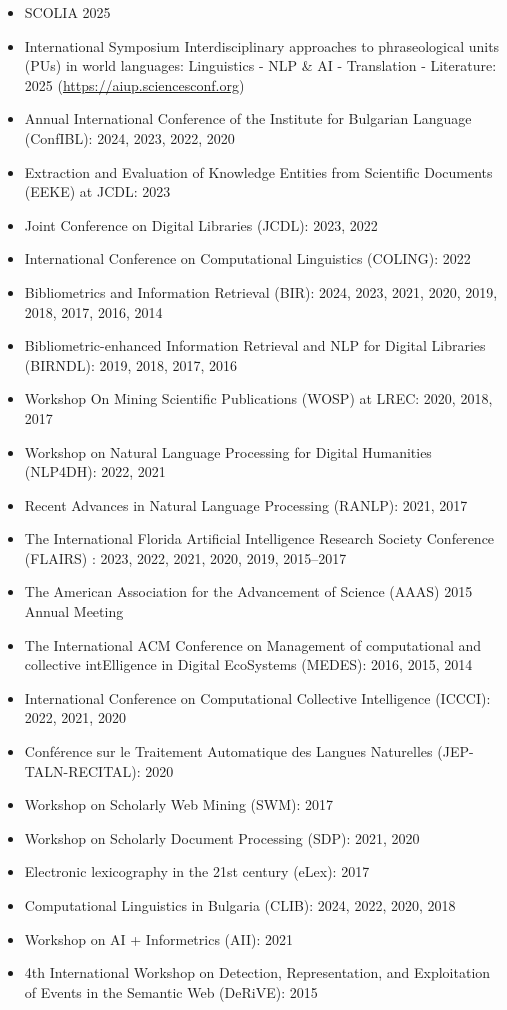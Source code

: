 \begin{itemize}
    \item SCOLIA 2025
    \item International Symposium Interdisciplinary approaches to phraseological units (PUs) in world languages: Linguistics - NLP \& AI - Translation - Literature: 2025 (\url{https://aiup.sciencesconf.org})
     \item Annual International Conference of the Institute for Bulgarian Language (ConfIBL): 2024, 2023, 2022, 2020
     \item Extraction and Evaluation of Knowledge Entities from Scientific Documents (EEKE) at JCDL: 2023
     \item Joint Conference on Digital Libraries (JCDL): 2023, 2022
     \item International Conference on Computational Linguistics (COLING): 2022
    \item Bibliometrics and Information Retrieval (BIR): 2024, 2023, 2021, 2020, 2019, 2018, 2017, 2016, 2014
    \item Bibliometric-enhanced Information Retrieval and NLP for Digital Libraries (BIRNDL): 2019, 2018, 2017, 2016
   \item Workshop On Mining Scientific Publications (WOSP) at LREC: 2020, 2018, 2017
   \item Workshop on Natural Language Processing for Digital Humanities (NLP4DH): 2022, 2021
   \item Recent Advances in Natural Language Processing (RANLP): 2021, 2017 
   \item The International Florida Artificial Intelligence Research Society Conference (FLAIRS) : 2023, 2022, 2021, 2020, 2019, 2015--2017
    \item The American Association for the Advancement of Science (AAAS) 2015 Annual Meeting
    \item The International ACM Conference on Management of computational and collective intElligence in Digital EcoSystems (MEDES): 2016, 2015, 2014
    \item International Conference on Computational Collective Intelligence (ICCCI): 2022, 2021, 2020
    \item Conférence sur le Traitement Automatique des Langues Naturelles (JEP-TALN-RECITAL): 2020
    \item Workshop on Scholarly Web Mining (SWM): 2017
    \item Workshop on Scholarly Document Processing (SDP): 2021, 2020
    \item Electronic lexicography in the 21st century (eLex): 2017
    \item Computational Linguistics in Bulgaria (CLIB): 2024, 2022, 2020, 2018
    \item Workshop on AI + Informetrics (AII): 2021
    \item 4th International Workshop on Detection, Representation, and Exploitation of Events in the Semantic Web (DeRiVE): 2015
\end{itemize}

